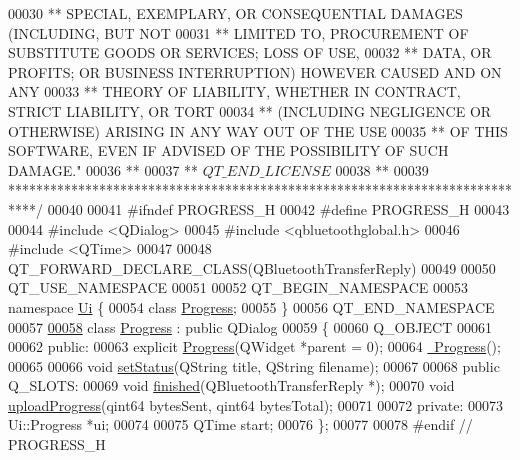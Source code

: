 \begin{DoxyCode}
00030 \textcolor{comment}{** SPECIAL, EXEMPLARY, OR CONSEQUENTIAL DAMAGES (INCLUDING, BUT NOT}
00031 \textcolor{comment}{** LIMITED TO, PROCUREMENT OF SUBSTITUTE GOODS OR SERVICES; LOSS OF USE,}
00032 \textcolor{comment}{** DATA, OR PROFITS; OR BUSINESS INTERRUPTION) HOWEVER CAUSED AND ON ANY}
00033 \textcolor{comment}{** THEORY OF LIABILITY, WHETHER IN CONTRACT, STRICT LIABILITY, OR TORT}
00034 \textcolor{comment}{** (INCLUDING NEGLIGENCE OR OTHERWISE) ARISING IN ANY WAY OUT OF THE USE}
00035 \textcolor{comment}{** OF THIS SOFTWARE, EVEN IF ADVISED OF THE POSSIBILITY OF SUCH DAMAGE."}
00036 \textcolor{comment}{**}
00037 \textcolor{comment}{** $QT\_END\_LICENSE$}
00038 \textcolor{comment}{**}
00039 \textcolor{comment}{****************************************************************************/}
00040 
00041 \textcolor{preprocessor}{#ifndef PROGRESS\_H}
00042 \textcolor{preprocessor}{#define PROGRESS\_H}
00043 
00044 \textcolor{preprocessor}{#include <QDialog>}
00045 \textcolor{preprocessor}{#include <qbluetoothglobal.h>}
00046 \textcolor{preprocessor}{#include <QTime>}
00047 
00048 QT\_FORWARD\_DECLARE\_CLASS(QBluetoothTransferReply)
00049 
00050 QT\_USE\_NAMESPACE
00051 
00052 QT\_BEGIN\_NAMESPACE
00053 namespace \hyperlink{namespaceUi}{Ui} \{
00054     \textcolor{keyword}{class }\hyperlink{classProgress}{Progress};
00055 \}
00056 QT\_END\_NAMESPACE
00057 
\hypertarget{progress_8h_source.tex_l00058}{}\hyperlink{classProgress}{00058} \textcolor{keyword}{class }\hyperlink{classProgress}{Progress} : \textcolor{keyword}{public} QDialog
00059 \{
00060     Q\_OBJECT
00061 
00062 \textcolor{keyword}{public}:
00063     \textcolor{keyword}{explicit} \hyperlink{classProgress_a51e0a5625142fedf57d9d822afb1b8d4}{Progress}(QWidget *parent = 0);
00064     \hyperlink{classProgress_abfa443f16958768636a59a560b625317}{~Progress}();
00065 
00066     \textcolor{keywordtype}{void} \hyperlink{classProgress_ae2fec44e18b6cfb3e4cba984bdb16824}{setStatus}(QString title, QString filename);
00067 
00068 \textcolor{keyword}{public} Q\_SLOTS:
00069     \textcolor{keywordtype}{void} \hyperlink{classProgress_a15a8bf25ca7faafcc866813f1fd90677}{finished}(QBluetoothTransferReply *);
00070     \textcolor{keywordtype}{void} \hyperlink{classProgress_ae4b8bbb82b1713a353688fb24ea39864}{uploadProgress}(qint64 bytesSent, qint64 bytesTotal);
00071 
00072 \textcolor{keyword}{private}:
00073     Ui::Progress *ui;
00074 
00075     QTime start;
00076 \};
00077 
00078 \textcolor{preprocessor}{#endif // PROGRESS\_H}
\end{DoxyCode}
